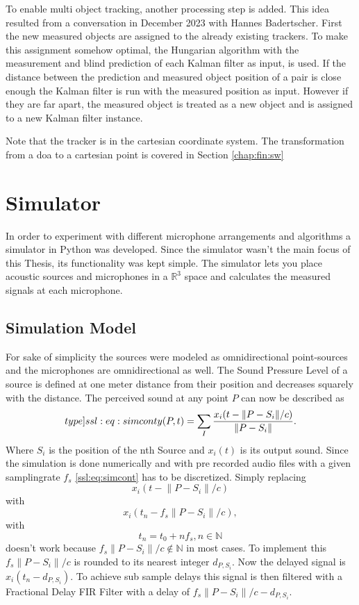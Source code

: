 To enable multi object tracking, another processing step is added.
This idea resulted from a conversation in December 2023 with 
Hannes Badertscher.
First the new measured objects are assigned to the already
existing trackers. 
To make this assignment somehow optimal, the Hungarian algorithm \cite{mathsem}
with the measurement and blind prediction of each Kalman filter as input, is used.
If the distance between the prediction and measured object position of a pair is close enough
the Kalman filter is run with the measured position as input.
However if they are far apart, the measured object is treated as a new object
and is assigned to a new Kalman filter instance.

Note that the tracker is in the cartesian coordinate system.
The transformation from a \acrshort{doa} to a cartesian point is
covered in Section \ref{chap:fin:sw}

\newpage
\section{Simulator}
In order to experiment with different microphone arrangements and algorithms a simulator in Python was developed.
Since the simulator wasn't the main focus of this Thesis, its functionality was kept simple.
The simulator lets you place acoustic sources and microphones in a $\mathbb{R}^3$ space and calculates
the measured signals at each microphone.

\subsection{Simulation Model}
For sake of simplicity the sources were modeled as omnidirectional point-sources and the
microphones are omnidirectional as well.
The Sound Pressure Level of a source is defined at one meter distance from their position and decreases
squarely with the distance.
The perceived sound at any point $P$ can now be described as
\begin{equation}
	\label[type]{ssl:eq:simcont}
	y(P, t) = \sum_{I} \frac{x_i(t - \lVert P - S_i\rVert/c)}{\lVert P - S_i\rVert}.
\end{equation}
Where $S_i$ is the position of the nth Source and $x_i(t)$ is its output sound.
Since the simulation is done numerically and with pre recorded audio files with a given
samplingrate $f_s$ \eqref{ssl:eq:simcont} has to be discretized.
Simply replacing
\begin{equation*}
	x_i(t - \lVert P - S_i\rVert/c)
\end{equation*}
with
\begin{equation*}
	x_i(t_n - f_s \lVert P - S_i\rVert/c),
\end{equation*}
with
\begin{equation*}
	t_n = t_0 + n f_s, n \in \mathbb{N}
\end{equation*}
doesn't work because
$f_s \lVert P - S_i\rVert/c \not \in \mathbb{N}$ in most cases.
To implement this $f_s \lVert P - S_i\rVert/c$ is rounded to
its nearest integer $d_{P,S_i}$.
Now the delayed signal is $x_i(t_n - d_{P,S_i})$.
To achieve sub sample delays this signal is then filtered
with a Fractional Delay FIR Filter \cite{FracFil} with a delay of
$f_s \lVert P - S_i\rVert/c - d_{P,S_i}$.

